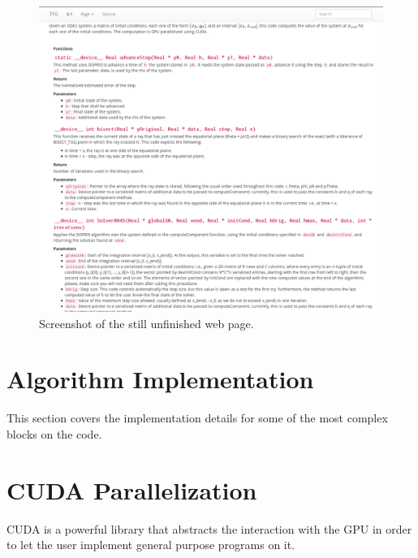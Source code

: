 \begin{figure}[bth]
	\myfloatalign
	\includegraphics[width=\linewidth]{gfx/documentationscreenshot}
	\caption[Screenshot of the still unfinished web page]{Screenshot of the still unfinished web page.}
	\label{fig:screenshot}
\end{figure}

\section{Algorithm Implementation}

This section covers the implementation details for some of the most complex blocks on the code.

\section{CUDA Parallelization}
\label{sec:cuda}

\ac{CUDA} is a powerful library that abstracts the interaction with the \ac{GPU} in order to let the user implement general purpose programs on it.

